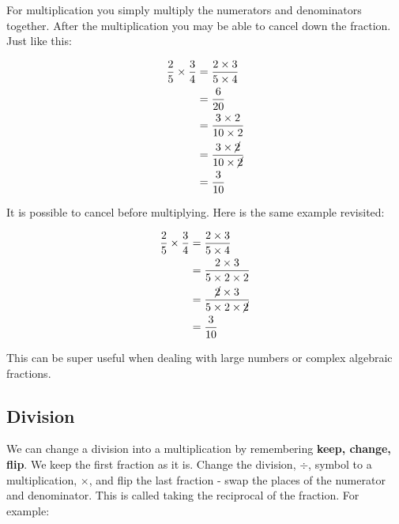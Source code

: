 \documentclass[
  a4paper,
]{scrbook}
\begin{document}
For multiplication you simply multiply the numerators and denominators
together. After the multiplication you may be able to cancel down the
fraction. Just like this:

\[
\begin{aligned} \frac{2}{5} \times \frac{3}{4} &= \frac{2 \times 3}{5 \times 4} \\
&= \frac{6}{20} \\
&= \frac{3 \times 2}{10 \times 2} \\
&= \frac{3 \times \cancel{2}}{10 \times \cancel{2}} \\
&= \frac{3}{10}
\end{aligned}
\]

\begin{tcolorbox}[enhanced jigsaw, opacityback=0, left=2mm, toptitle=1mm, title=\textcolor{quarto-callout-tip-color}{\faLightbulb}\hspace{0.5em}{Pro-tip}, breakable, colbacktitle=quarto-callout-tip-color!10!white, opacitybacktitle=0.6, bottomtitle=1mm, arc=.35mm, colback=white, leftrule=.75mm, bottomrule=.15mm, colframe=quarto-callout-tip-color-frame, rightrule=.15mm, titlerule=0mm, toprule=.15mm, coltitle=black]
It is possible to cancel before multiplying. Here is the same example
revisited:

\[
\begin{aligned} \frac{2}{5} \times \frac{3}{4} &= \frac{2 \times 3}{5 \times 4} \\
&= \frac{2 \times 3}{5 \times 2 \times 2} \\
&= \frac{\cancel{2} \times 3}{5 \times 2 \times \cancel{2}} \\
&= \frac{3}{10}
\end{aligned}
\]

This can be super useful when dealing with large numbers or complex
algebraic fractions.
\end{tcolorbox}

\hypertarget{division}{%
\subsection{Division}\label{division}}

We can change a division into a multiplication by remembering
\textbf{keep, change, flip}. We keep the first fraction as it is. Change
the division, \(\div\), symbol to a multiplication, \(\times\), and flip
the last fraction - swap the places of the numerator and denominator.
This is called taking the reciprocal of the fraction. For example:
\end{document}

